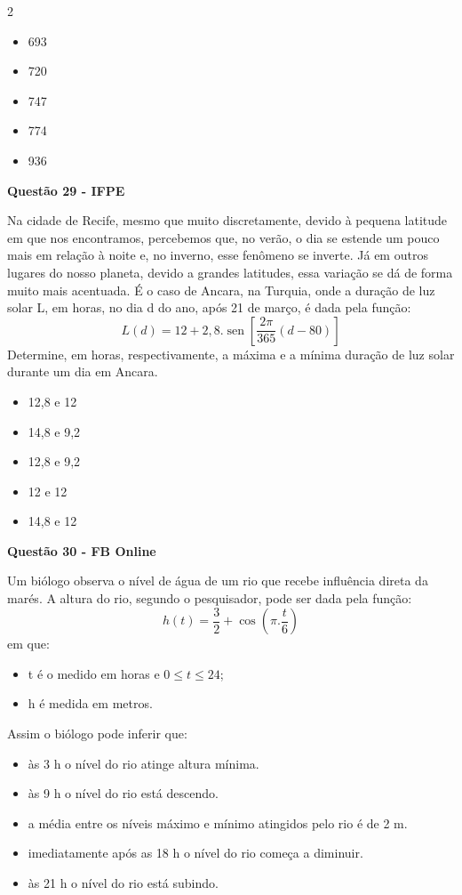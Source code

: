 \documentclass[12pt]{article}
\newcommand{\sen}{\operatorname{sen}}
\newcommand{\vermelho}[1]{{\color{red}#1}}
\begin{document}
\begin{multicols}{2}
	\begin{itemize}
		\item[(A)] 693
		\item[(B)] \vermelho{720} %
		\item[(C)] 747
		\item[(D)] 774
		\item[(E)] 936
	\end{itemize}
	
\textbf{Questão 29 - IFPE}
	
	Na cidade de Recife, mesmo que muito discretamente,
	devido à pequena latitude em que nos encontramos,
	percebemos que, no verão, o dia se estende um pouco
	mais em relação à noite e, no inverno, esse fenômeno se
	inverte. Já em outros lugares do nosso planeta, devido
	a grandes latitudes, essa variação se dá de forma muito mais
	acentuada. É o caso de Ancara, na Turquia, onde a duração
	de luz solar L, em horas, no dia d do ano, após 21 de março,
	é dada pela função: $$L(d)=12+2,8.\sen\left[\dfrac{2\pi}{365}\left( d-80 \right) \right]$$ Determine, em horas, respectivamente, a máxima e a mínima
	duração de luz solar durante um dia em Ancara.
	
	 \begin{itemize}
	 	\item[(A)] 12,8 e 12
	 	\item[(B)] \vermelho{14,8 e 9,2} %
	 	\item[(C)] 12,8 e 9,2
	 	\item[(D)] 12 e 12
	 	\item[(E)] 14,8 e 12
	 \end{itemize}
	 
\textbf{Questão 30 - FB Online}

	Um biólogo observa o nível de água de um rio que recebe influência direta da marés. A altura do rio, segundo o pesquisador, pode ser dada pela função: $$h(t)=\dfrac{3}{2}+\cos \left( \pi . \dfrac{t}{6}\right)$$ em que:
	
	\begin{itemize}
		\item t é o medido em horas e $0 \le t \le 24$;
		\item h é medida em metros.
	\end{itemize} Assim o biólogo pode inferir que:
	
	\begin{itemize}
		\item[(A)] às 3 h o nível do rio atinge altura mínima.
		\item[(B)] às 9 h o nível do rio está descendo.
		\item[(C)] a média entre os níveis máximo e mínimo atingidos pelo rio
		é de 2 m.
		\item[(D)] imediatamente após as 18 h o nível do rio começa a diminuir.
		\item[(E)] \vermelho{às 21 h o nível do rio está subindo.} %
	\end{itemize}
	
\end{multicols}
\end{document}
